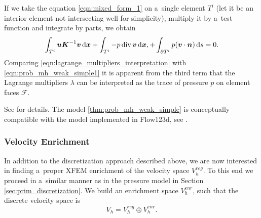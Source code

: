 If we take the equation \eqref{eqn:mixed_form_1} on a~single element $T^i$ (let it be an interior element not intersecting well for simplicity),
multiply it by a~test function and integrate by parts, we obtain
\begin{align} \label{eqn:lagrange_multipliers_interpretation}
    \int_{T^i} \mathbf{\boldsymbol{u}} \mathbf{\boldsymbol{K}}^{-1} \mathbf{\boldsymbol{v}} \,{\rm d}\mathbf{\boldsymbol{x}}
    + \int_{T^i} -p\,{\rm div}\,\mathbf{\boldsymbol{v}} \,{\rm d}\mathbf{\boldsymbol{x}},
    + \int_{\partial T^i} p (\mathbf{\boldsymbol{v}} \cdot \mathbf{\boldsymbol{n}}) \,{\rm d} s = 0.
\end{align}
Comparing \eqref{eqn:lagrange_multipliers_interpretation} with \eqref{eqn:prob_mh_weak_simple1}
it is apparent from the third term that the Lagrange multipliers $\lambda$ can be interpreted
as the trace of pressure $p$ on element faces $\mathcal F$.

See \cite{lawrence_balancing_1995} for details.
The model \ref{thm:prob_mh_weak_simple} is conceptually compatible with the model implemented in Flow123d, see \cite{sistek_bddc_2015, flow123d}.


\subsubsection{Velocity Enrichment}
\label{sec:velocity_enrichment}

In addition to the discretization approach described above, we are now interested in finding
a~proper XFEM enrichment of the velocity space $V^{reg}_h$.
To this end we proceed in a~similar manner as in the pressure model in Section \ref{sec:prim_discretization}.
We build an enrichment space $V_h^{enr}$, such that the discrete velocity space is
\begin{equation}
    V_h = V_h^{reg} \oplus V_h^{enr}.
\end{equation}

